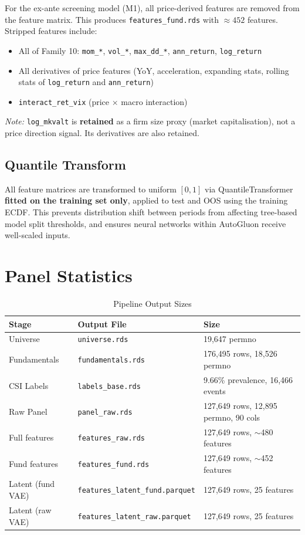 \documentclass{report}\usepackage[]{graphicx}\usepackage[table]{xcolor}
\begin{document}
For the ex-ante screening model (M1), all price-derived features are removed from the 
feature matrix. This produces \texttt{features\_fund.rds} with $\approx 452$ features. 
Stripped features include:

\begin{itemize}
    \item All of Family 10: \texttt{mom\_*}, \texttt{vol\_*}, \texttt{max\_dd\_*}, 
    \texttt{ann\_return}, \texttt{log\_return}
    \item All derivatives of price features (YoY, acceleration, expanding stats, 
    rolling stats of \texttt{log\_return} and \texttt{ann\_return})
    \item \texttt{interact\_ret\_vix} (price $\times$ macro interaction)
\end{itemize}

\noindent \textit{Note:} \texttt{log\_mkvalt} is \textbf{retained} as a firm size proxy 
(market capitalisation), not a price direction signal. Its derivatives are also retained.

\subsection{Quantile Transform}

All feature matrices are transformed to uniform $[0,1]$ via QuantileTransformer 
\textbf{fitted on the training set only}, applied to test and OOS using the training ECDF. 
This prevents distribution shift between periods from affecting tree-based model 
split thresholds, and ensures neural networks within AutoGluon receive well-scaled inputs.

\section{Panel Statistics}

\begin{table}[H]
\centering
\caption{Pipeline Output Sizes}
\begin{tabular}{lll}
\toprule
\textbf{Stage} & \textbf{Output File} & \textbf{Size} \\
\midrule
Universe & \texttt{universe.rds} & 19,647 permno \\
Fundamentals & \texttt{fundamentals.rds} & 176,495 rows, 18,526 permno \\
CSI Labels & \texttt{labels\_base.rds} & 9.66\% prevalence, 16,466 events \\
Raw Panel & \texttt{panel\_raw.rds} & 127,649 rows, 12,895 permno, 90 cols \\
Full features & \texttt{features\_raw.rds} & 127,649 rows, $\sim$480 features \\
Fund features & \texttt{features\_fund.rds} & 127,649 rows, $\sim$452 features \\
Latent (fund VAE) & \texttt{features\_latent\_fund.parquet} & 127,649 rows, 25 features \\
Latent (raw VAE) & \texttt{features\_latent\_raw.parquet} & 127,649 rows, 25 features \\
\bottomrule
\end{tabular}
\end{table}
\end{document}
